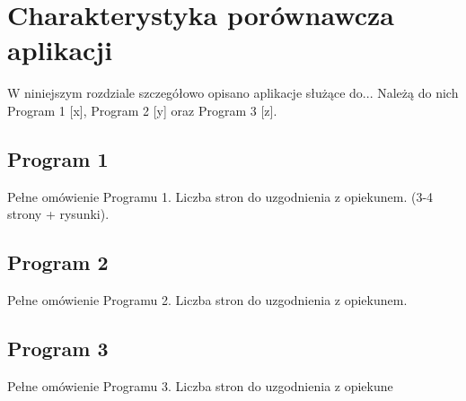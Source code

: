 \section{Charakterystyka porównawcza aplikacji}
W niniejszym rozdziale szczegółowo opisano aplikacje służące do... Należą do nich Program
1 [x], Program 2 [y] oraz Program 3 [z].
\subsection{Program 1}
Pełne omówienie Programu 1. Liczba stron do uzgodnienia z opiekunem. (3-4 strony +
rysunki).
\subsection{Program 2}
Pełne omówienie Programu 2. Liczba stron do uzgodnienia z opiekunem.
\subsection{Program 3}
Pełne omówienie Programu 3. Liczba stron do uzgodnienia z opiekune
